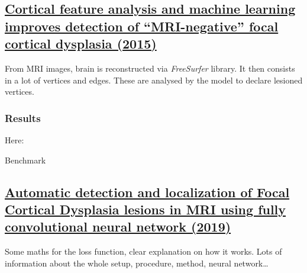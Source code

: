 \subsection{\href{https://www.sciencedirect.com/science/article/pii/S1525505015002322}{Cortical feature analysis and machine learning improves detection of “MRI-negative” focal cortical dysplasia (2015)}}
\label{sub:sec:res3}

From MRI images, brain is reconstructed via \emph{FreeSurfer} library. It then consists in a lot of vertices and edges.
These are analysed by the model to declare lesioned vertices.

\subsubsection{Results}

Here: 

\begin{table}[htbp]
	\centering
	\caption{Benchmark}

	\caption{Results from }%
	\label{tab:res3}
\end{table}

\subsection{\href{https://www.sciencedirect.com/science/article/pii/S1746809419301211\#sec0010}{Automatic detection and localization of Focal Cortical Dysplasia lesions in MRI using fully convolutional neural network (2019)}}
\label{sub:sec:res4}

Some maths for the loss function, clear explanation on how it works.
Lots of information about the whole setup, procedure, method, neural network\dots

